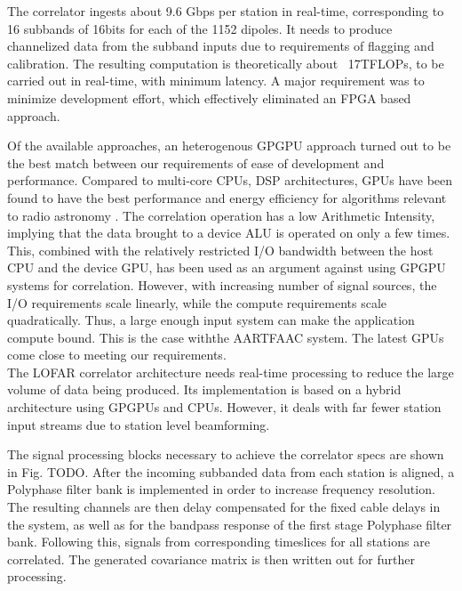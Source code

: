 \documentclass{ws-jai}
\begin{document}
The correlator ingests about 9.6 Gbps per station in real-time, corresponding to
16  subbands of  16bits for  each  of the  1152  dipoles.  It  needs to  produce
channelized data  from the subband  inputs due  to requirements of  flagging and
calibration. The resulting  computation is theoretically about  ~17TFLOPs, to be
carried out  in real-time,  with minimum  latency.  A  major requirement  was to
minimize  development  effort,  which   effectively  eliminated  an  FPGA  based
approach.

Of the available approaches, an heterogenous GPGPU approach turned out to be the
best   match   between   our   requirements   of   ease   of   development   and
performance.  Compared to  multi-core CPUs,  DSP architectures,  GPUs have  been
found to have the best performance and energy efficiency for algorithms relevant
to radio astronomy \cite{romein2016comparison}.  The correlation operation has a
low Arithmetic  Intensity, implying  that the  data brought to  a device  ALU is
operated on only a few times.  This, combined with the relatively restricted I/O
bandwidth between the host CPU and the  device GPU, has been used as an argument
against using GPGPU systems for  correlation. However, with increasing number of
signal  sources,  the  I/O  requirements   scale  linearly,  while  the  compute
requirements scale quadratically. Thus, a large enough input system can make the
application compute bound. This is the  case withthe AARTFAAC system. The latest
GPUs come close to meeting our requirements.\\ The LOFAR correlator architecture
needs real-time  processing to reduce the  large volume of data  being produced.
Its implementation  is based  on a  hybrid architecture  using GPGPUs  and CPUs.
However, it  deals with  far fewer  station input streams  due to  station level
beamforming.


The signal processing blocks necessary to achieve the correlator specs are shown
in Fig. TODO.  After the incoming subbanded data from each station is aligned, a
Polyphase filter bank is implemented  in order to increase frequency resolution.
The resulting channels are then delay  compensated for the fixed cable delays in
the system, as  well as for the  bandpass response of the  first stage Polyphase
filter  bank.  Following  this, signals  from corresponding  timeslices for  all
stations are correlated. The generated covariance matrix is then written out for
further processing.
\end{document}
